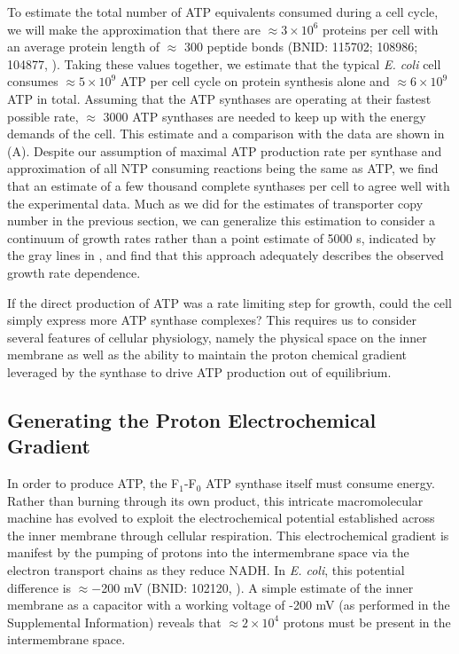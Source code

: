 To estimate the total number of ATP equivalents consumed during a cell cycle,
we will make the approximation that there are $\approx 3\times10^6$ proteins
per cell with an average protein length of $\approx$ 300 peptide bonds (BNID:
115702; 108986; 104877, \cite{milo2010}). Taking these values together, we
estimate that the typical \textit{E. coli} cell consumes $\approx 5 \times
10^9$ ATP per cell cycle on protein synthesis alone and $\approx 6\times
10^9$ ATP in total. Assuming that the ATP synthases are operating at their
fastest possible rate, $\approx$ 3000 ATP synthases are needed to keep up
with the energy demands of the cell. This estimate and a comparison with the
data are shown in  (A). Despite our assumption of
maximal ATP production rate per synthase and approximation of all NTP
consuming reactions being the same as ATP, we find that an estimate of a few
thousand complete synthases per cell to agree well with the experimental
data. Much as we did for the estimates of transporter copy number in the
previous section, we can
generalize this estimation to consider a continuum of growth rates rather than a
point estimate of 5000 s, indicated by the gray lines in
, and find that this approach adequately describes the
observed growth rate dependence. 

If the direct production of ATP was a rate limiting step for
growth, could the cell simply express more ATP synthase complexes? This
requires us to consider several features of cellular physiology, namely the
physical space on the inner membrane as well as the ability to maintain the
proton chemical gradient leveraged by the synthase to drive ATP production
out of equilibrium.

\subsection{Generating the Proton Electrochemical Gradient}
In order to produce ATP, the F$_1$-F$_0$ ATP synthase itself must consume
energy. Rather than burning through its own product, this intricate
macromolecular machine has evolved to exploit the electrochemical potential
established across the inner membrane through cellular respiration. This
electrochemical gradient is manifest  by the pumping of protons into the
intermembrane space via the electron transport chains as they reduce NADH. In
\textit{E. coli}, this potential difference is $\approx -$200 mV (BNID: 102120,
\cite{milo2010}). A simple estimate of the inner membrane as a capacitor with a
working voltage of -200 mV (as performed in the Supplemental Information)
reveals that $\approx 2\times 10^4$ protons must be present in the intermembrane space.

